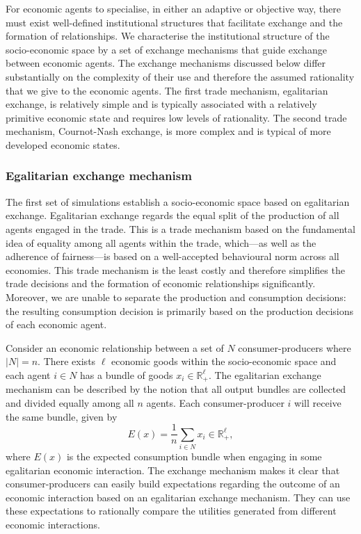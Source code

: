 For economic agents to specialise, in either an adaptive or objective way, there must exist well-defined institutional structures that facilitate exchange and the formation of relationships. We characterise the institutional structure of the socio-economic space by a set of exchange mechanisms that guide exchange between economic agents. The exchange mechanisms discussed below differ substantially on the complexity of their use and therefore the assumed rationality that we give to the economic agents. The first trade mechanism, egalitarian exchange, is relatively simple and is typically associated with a relatively primitive economic state \citep{Graeber2011} and requires low levels of rationality. The second trade mechanism, Cournot-Nash exchange, is more complex and is typical of more developed economic states.

\subsubsection{Egalitarian exchange mechanism}

The first set of simulations establish a socio-economic space based on egalitarian exchange. Egalitarian exchange regards the equal split of the production of all agents engaged in the trade. This is a trade mechanism based on the fundamental idea of equality among all agents within the trade, which---as well as the adherence of fairness---is based on a well-accepted behavioural norm across all economies. This trade mechanism is the least costly and therefore simplifies the trade decisions and the formation of economic relationships significantly. Moreover, we are unable to separate the production and consumption decisions: the resulting consumption decision is primarily based on the production decisions of each economic agent.

Consider an economic relationship between a set of $N$ consumer-producers where $|N| = n$. There exists $\ell$ economic goods within the socio-economic space and each agent $i \in N$ has a bundle of goods $x_i \in \mathbb{R}^{\ell}_{+}$. The egalitarian exchange mechanism can be described by the notion that all output bundles are collected and divided equally among all $n$ agents. Each consumer-producer $i$ will receive the same bundle, given by
\begin{equation}
E(x) = \frac{1}{n} \sum_{i \in N} x_i \in \mathbb{R}^{\ell}_{+},
\end{equation}
where $E(x)$ is the expected consumption bundle when engaging in some egalitarian economic interaction. The exchange mechanism makes it clear that consumer-producers can easily build expectations regarding the outcome of an economic interaction based on an egalitarian exchange mechanism. They can use these expectations to rationally compare the utilities generated from different economic interactions.


